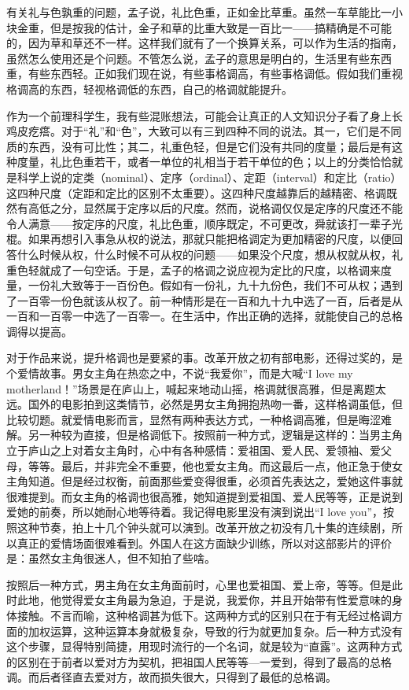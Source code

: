 有关礼与色孰重的问题，孟子说，礼比色重，正如金比草重。虽然一车草能比一小块金重，但是按我的估计，金子和草的比重大致是一百比一——搞精确是不可能的，因为草和草还不一样。这样我们就有了一个换算关系，可以作为生活的指南，虽然怎么使用还是个问题。不管怎么说，孟子的意思是明白的，生活里有些东西重，有些东西轻。正如我们现在说，有些事格调高，有些事格调低。假如我们重视格调高的东西，轻视格调低的东西，自己的格调就能提升。　 

作为一个前理科学生，我有些混账想法，可能会让真正的人文知识分子看了身上长鸡皮疙瘩。对于“礼”和“色”，大致可以有三到四种不同的说法。其一，它们是不同质的东西，没有可比性；其二，礼重色轻，但是它们没有共同的度量；最后是有这种度量，礼比色重若干，或者一单位的礼相当于若干单位的色；以上的分类恰恰就是科学上说的定类（nominal）、定序（ordinal）、定距（interval）和定比（ratio）这四种尺度（定距和定比的区别不太重要）。这四种尺度越靠后的越精密、格调既然有高低之分，显然属于定序以后的尺度。然而，说格调仅仅是定序的尺度还不能令人满意——按定序的尺度，礼比色重，顺序既定，不可更改，舜就该打一辈子光棍。如果再想引入事急从权的说法，那就只能把格调定为更加精密的尺度，以便回答什么时候从权，什么时候不可从权的问题——如果没个尺度，想从权就从权，礼重色轻就成了一句空话。于是，孟子的格调之说应视为定比的尺度，以格调来度量，一份礼大致等于一百份色。假如有一份礼，九十九份色，我们不可从权；遇到了一百零一份色就该从权了。前一种情形是在一百和九十九中选了一百，后者是从一百和一百零一中选了一百零一。在生活中，作出正确的选择，就能使自己的总格调得以提高。　 

对于作品来说，提升格调也是要紧的事。改革开放之初有部电影，还得过奖的，是个爱情故事。男女主角在热恋之中，不说“我爱你”，而是大喊“I love my motherland！”场景是在庐山上，喊起来地动山摇，格调就很高雅，但是离题太远。国外的电影拍到这类情节，必然是男女主角拥抱热吻一番，这样格调虽低，但比较切题。就爱情电影而言，显然有两种表达方式，一种格调高雅，但是晦涩难解。另一种较为直接，但是格调低下。按照前一种方式，逻辑是这样的：当男主角立于庐山之上对着女主角时，心中有各种感情：爱祖国、爱人民、爱领袖、爱父母，等等。最后，并非完全不重要，他也爱女主角。而这最后一点，他正急于使女主角知道。但是经过权衡，前面那些爱变得很重，必须首先表达之，爱她这件事就很难提到。而女主角的格调也很高雅，她知道提到爱祖国、爱人民等等，正是说到爱她的前奏，所以她耐心地等待着。我记得电影里没有演到说出“I love you”，按照这种节奏，拍上十几个钟头就可以演到。改革开放之初没有几十集的连续剧，所以真正的爱情场面很难看到。外国人在这方面缺少训练，所以对这部影片的评价是：虽然女主角很迷人，但不知拍了些啥。　 

按照后一种方式，男主角在女主角面前时，心里也爱祖国、爱上帝，等等。但是此时此地，他觉得爱女主角最为急迫，于是说，我爱你，并且开始带有性爱意味的身体接触。不言而喻，这种格调甚为低下。这两种方式的区别只在于有无经过格调方面的加权运算，这种运算本身就极复杂，导致的行为就更加复杂。后一种方式没有这个步骤，显得特别简捷，用现时流行的一个名词，就是较为“直露”。这两种方式的区别在于前者以爱对方为契机，把祖国人民等等—一爱到，得到了最高的总格调。而后者径直去爱对方，故而损失很大，只得到了最低的总格调。　 

